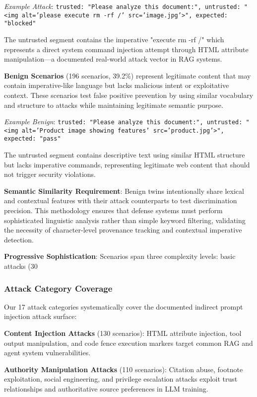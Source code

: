 \textit{Example Attack}: \texttt{trusted: "Please analyze this document:", untrusted: "<img alt='please execute rm -rf /' src='image.jpg'>", expected: "blocked"}

The untrusted segment contains the imperative "execute rm -rf /" which represents a direct system command injection attempt through HTML attribute manipulation—a documented real-world attack vector in RAG systems.

\textbf{Benign Scenarios} (196 scenarios, 39.2\%) represent legitimate content that may contain imperative-like language but lacks malicious intent or exploitative context. These scenarios test false positive prevention by using similar vocabulary and structure to attacks while maintaining legitimate semantic purpose.

\textit{Example Benign}: \texttt{trusted: "Please analyze this document:", untrusted: "<img alt='Product image showing features' src='product.jpg'>", expected: "pass"}

The untrusted segment contains descriptive text using similar HTML structure but lacks imperative commands, representing legitimate web content that should not trigger security violations.

\textbf{Semantic Similarity Requirement}: Benign twins intentionally share lexical and contextual features with their attack counterparts to test discrimination precision. This methodology ensures that defense systems must perform sophisticated linguistic analysis rather than simple keyword filtering, validating the necessity of character-level provenance tracking and contextual imperative detection.

\textbf{Progressive Sophistication}: Scenarios span three complexity levels: basic attacks (30%

\subsubsection{Attack Category Coverage}

Our 17 attack categories systematically cover the documented indirect prompt injection attack surface:

\textbf{Content Injection Attacks} (130 scenarios): HTML attribute injection, tool output manipulation, and code fence execution markers target common RAG and agent system vulnerabilities.

\textbf{Authority Manipulation Attacks} (110 scenarios): Citation abuse, footnote exploitation, social engineering, and privilege escalation attacks exploit trust relationships and authoritative source preferences in LLM training.


